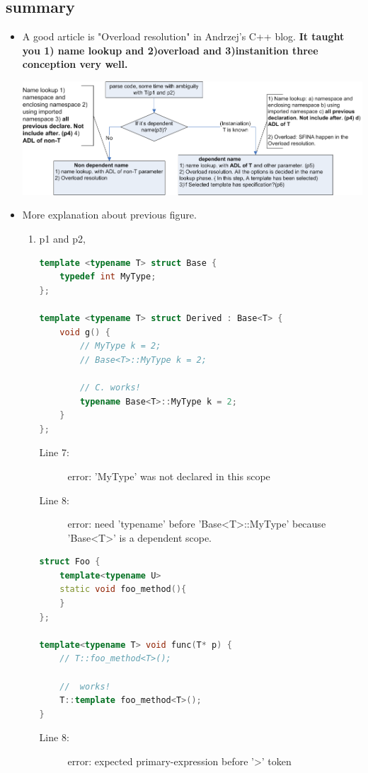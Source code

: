 \documentclass[a4paper,11pt,twoside]{book}
\begin{document}
\subsection{summary}
\begin{itemize}
\item A good article is "Overload resolution" in Andrzej's C++ blog. \textbf{It taught you 1) name lookup and 2)overload and 3)instanition three conception very well.}


\includegraphics[scale=0.8]{pics/template.png}

\item More explanation about previous figure.
\begin{enumerate}
\item p1 and p2, 
\begin{lstlisting}[frame=single, language=c++]
template <typename T> struct Base {
	typedef int MyType;
};

template <typename T> struct Derived : Base<T> {
	void g() {
		// MyType k = 2;
		// Base<T>::MyType k = 2;
		
		// C. works!
		typename Base<T>::MyType k = 2;
	}
};
\end{lstlisting}
\begin{description}
	\item[Line 7:]  error: 'MyType' was not declared in this scope
	
	\item[Line 8:] error: need 'typename' before 'Base<T>::MyType' because 'Base<T>' is a dependent scope.
\end{description}

\begin{lstlisting}[frame=single, language=c++]
struct Foo {
	template<typename U>
	static void foo_method(){
	}
};

template<typename T> void func(T* p) {
	// T::foo_method<T>();
	
	//  works!
	T::template foo_method<T>();
}
\end{lstlisting}
\begin{description}
	\item[Line 8:] error: expected primary-expression before '>' token
\end{description}


\end{enumerate}
\end{itemize}
\end{document}

